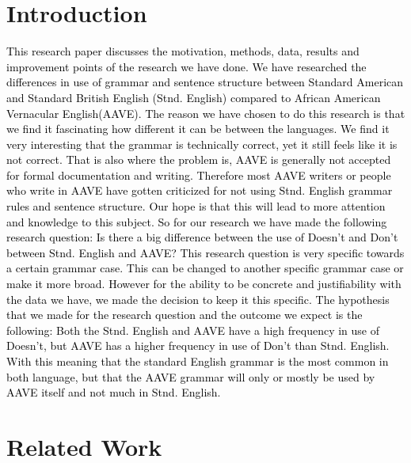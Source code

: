 \documentclass[11pt]{article}
\begin{document}
\section{Introduction}
\textcolor{black}{This research paper discusses the motivation, methods, data, results and improvement points of the research we have done. We have researched the differences in use of grammar and sentence structure between Standard American and Standard British English (Stnd. English) compared to African American Vernacular English(AAVE). The reason we have chosen to do this research is that we find it fascinating how different it can be between the languages. We find it very interesting that the grammar is technically correct, yet it still feels like it is not correct. That is also where the problem is, AAVE is generally not accepted for formal documentation and writing. Therefore most AAVE writers or people who write in AAVE have gotten criticized for not using Stnd. English grammar rules and sentence structure. Our hope is that this will lead to more attention and knowledge to this subject. So for our research we have made the following research question: Is there a big difference between the use of Doesn’t and Don’t between Stnd. English and AAVE? This research question is very specific towards a certain grammar case. This can be changed to another specific grammar case or make it more broad. However for the ability to be concrete and justifiability with the data we have, we made the decision to keep it this specific. The hypothesis that we made for the research question and the outcome we expect is the following: Both the Stnd. English and AAVE have a high frequency in use of Doesn’t, but AAVE has a higher frequency in use of Don’t than Stnd. English. With this meaning that the standard English grammar is the most common in both language, but that the AAVE grammar will only or mostly be used by AAVE itself and not much in Stnd. English.} 

\section{Related Work}
\end{document}

